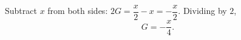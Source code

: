 Subtract $x$ from both sides: $2G=\dfrac {x}{2}-x=-\dfrac {x}{2}$. Dividing by $2$,
\[G=\boxed{-\dfrac {x}{4}}.\]
